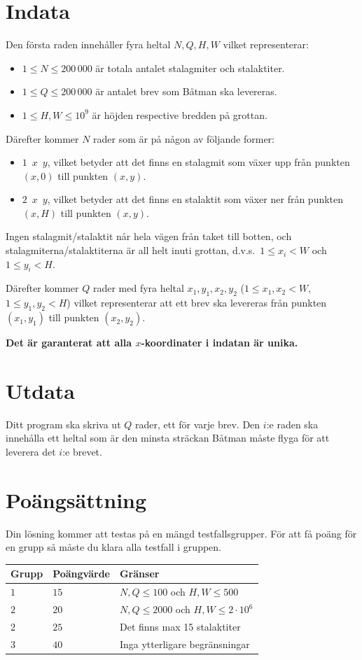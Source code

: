 \section*{Indata}
Den första raden innehåller fyra heltal $N,Q,H,W$ vilket representerar:
\begin{itemize}
  \item $1 \le N\le 200\,000$ är totala antalet stalagmiter och stalaktiter.
  \item $1 \le Q\le 200\,000$ är antalet brev som Båtman ska levereras.
  \item $1 \le H,W\le 10^9$ är höjden respective bredden på grottan.
\end{itemize}
Därefter kommer $N$ rader som är på någon av följande former:
\begin{itemize}
  \item $1\enspace x\enspace y$, vilket betyder att det finns en stalagmit
    som växer upp från punkten $(x,0)$ till punkten $(x,y)$.
  \item $2\enspace x\enspace y$, vilket betyder att det finns en stalaktit
    som växer ner från punkten $(x,H)$ till punkten $(x,y)$.
\end{itemize}
Ingen stalagmit/stalaktit når hela vägen från taket till botten,
och stalagmiterna/stalaktiterna är all helt inuti grottan,
d.v.s.\ $1\le x_{i} < W$ och $1\le y_{i} < H$.

Därefter kommer $Q$ rader med fyra heltal
$x_{1},y_{1},x_{2},y_{2}$ ($1\le x_{1},x_{2} < W$, $1\le y_{1},y_{2}< H$) vilket representerar att ett brev ska levereras från
punkten $(x_{1},y_{1})$ till punkten $(x_{2},y_{2})$.

\textbf{Det är garanterat att alla $x$-koordinater i indatan är unika.}

\section*{Utdata}
Ditt program ska skriva ut $Q$ rader, ett för varje brev.
Den $i$:e raden ska innehålla ett heltal som är den minsta
sträckan Båtman måste flyga för att leverera det $i$:e brevet.

\section*{Poängsättning}
Din lösning kommer att testas på en mängd testfallsgrupper.
För att få poäng för en grupp så måste du klara alla testfall i gruppen.

\noindent
\begin{tabular}{| l | l | l |}
\hline
Grupp & Poängvärde & Gränser \\ \hline
$1$    & $15$         & $N,Q\le 100$ och $H,W\le 500$ \\ \hline
$2$    & $20$         & $N,Q \le 2000$ och $H,W\le 2\cdot 10^6$\\ \hline
$2$    & $25$         & Det finns max 15 stalaktiter \\ \hline
$3$    & $40$         & Inga ytterligare begränsningar \\ \hline
\end{tabular}
